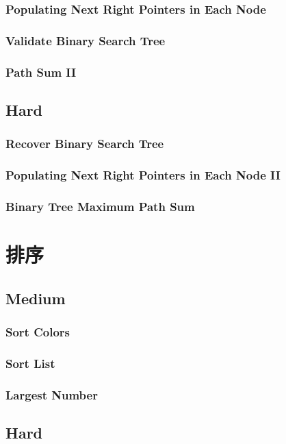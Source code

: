 \documentclass[11pt]{book}
\begin{document}
\subsection{Populating Next Right Pointers in Each Node}
\label{sec-8-2-8}
\subsection{Validate Binary Search Tree}
\label{sec-8-2-9}
\subsection{Path Sum II}
\label{sec-8-2-10}
\section{Hard}
\label{sec-8-3}
\subsection{Recover Binary Search Tree}
\label{sec-8-3-1}
\subsection{Populating Next Right Pointers in Each Node II}
\label{sec-8-3-2}
\subsection{Binary Tree Maximum Path Sum}
\label{sec-8-3-3}
\chapter{排序}
\label{sec-9}
\section{Medium}
\label{sec-9-1}
\subsection{Sort Colors}
\label{sec-9-1-1}
\subsection{Sort List}
\label{sec-9-1-2}
\subsection{Largest Number}
\label{sec-9-1-3}
\section{Hard}
\label{sec-9-2}
\end{document}
